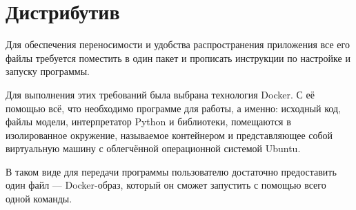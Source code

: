 \section{Дистрибутив}

Для обеспечения переносимости и удобства распространения приложения все его файлы требуется поместить в один пакет и прописать инструкции по настройке и запуску программы.

Для выполнения этих требований была выбрана технология Docker. С её помощью всё, что необходимо программе для работы, а именно: исходный код, файлы модели, интерпретатор Python и библиотеки, помещаются в изолированное окружение, называемое контейнером и представляющее собой виртуальную машину с облегчённой операционной системой Ubuntu.

В таком виде для передачи программы пользователю достаточно предоставить один файл --- Docker-образ, который он сможет запустить с помощью всего одной команды.